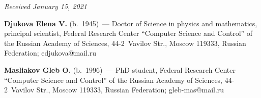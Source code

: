 \vspace*{-3pt}

\hfill{\small\textit{Received January 15, 2021}}



\Contr

\noindent
\textbf{Djukova Elena V.} (b.\ 1945)~--- Doctor of Science in physics and mathematics, principal 
scientist, Federal Research Center ``Computer Science and Control'' of the Russian Academy of 
Sciences, 44-2~Vavilov Str., Moscow 119333, Russian Federation;  \mbox{edjukova@mail.ru}

\vspace*{3pt}

\noindent
\textbf{Masliakov Gleb O.} (b.\ 1996)~---  PhD student, Federal Research Center ``Computer Science 
and Control'' of the Russian Academy of Sciences, 44-2~Vavilov Str., Moscow 119333, Russian 
Federation; \mbox{gleb-mas@mail.ru}

  
\label{end\stat}

\renewcommand{\bibname}{\protect\rm Литература} 
